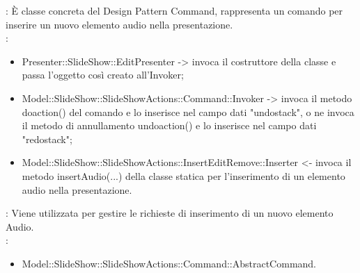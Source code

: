 {{				\textbf{\tipo}: È classe concreta del Design Pattern Command, rappresenta un comando per inserire un nuovo elemento audio nella presentazione.\\	
				\textbf{\relaz}: 
				\begin{itemize}
					\item Presenter::SlideShow::EditPresenter -> invoca il costruttore della classe e passa l’oggetto così creato all’Invoker;
					\item Model::SlideShow::SlideShowActions::Command::Invoker -> invoca il metodo doaction() del comando e lo inserisce nel campo dati "undostack", o ne invoca il metodo di annullamento undoaction() e lo inserisce nel campo dati "redostack";
                    \item Model::SlideShow::SlideShowActions::InsertEditRemove::Inserter <- invoca il metodo insertAudio(...) della classe statica per l’inserimento di un elemento audio nella presentazione.
				\end{itemize}	
                \textbf{\interfacce}: Viene utilizzata per gestire le richieste di inserimento di un nuovo elemento Audio.\\
                \textbf{\base}: 
                    \begin{itemize}
                    \item Model::SlideShow::SlideShowActions::Command::AbstractCommand.
                    \end{itemize}
                    }
                }
